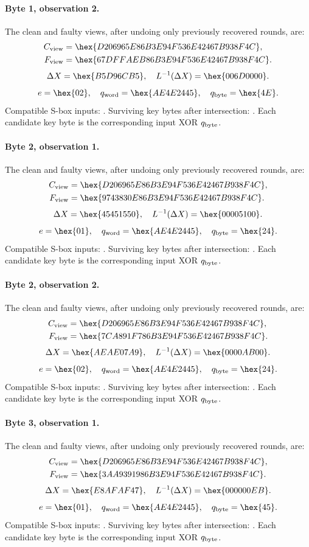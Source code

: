\paragraph{Byte 1, observation 2.}
The clean and faulty views, after undoing only previously recovered rounds, are:
\[\begin{aligned}C_{\rm view}&=\hex{D206965E86B3E94F536E42467B938F4C},\\F_{\rm view}&=\hex{67DFFAEB86B3E94F536E42467B938F4C}.\end{aligned}\]
\[\Delta X=\hex{B5D96CB5},\quad L^{-1}(\Delta X)=\hex{006D0000}.\]
\[e=\hex{02},\quad q_{\rm word}=\hex{AE4E2445},\quad q_{\rm byte}=\hex{4E}.\]
Compatible S-box inputs: . Surviving key bytes after intersection: . Each candidate key byte is the corresponding input XOR $q_{\rm byte}$.
\paragraph{Byte 2, observation 1.}
The clean and faulty views, after undoing only previously recovered rounds, are:
\[\begin{aligned}C_{\rm view}&=\hex{D206965E86B3E94F536E42467B938F4C},\\F_{\rm view}&=\hex{9743830E86B3E94F536E42467B938F4C}.\end{aligned}\]
\[\Delta X=\hex{45451550},\quad L^{-1}(\Delta X)=\hex{00005100}.\]
\[e=\hex{01},\quad q_{\rm word}=\hex{AE4E2445},\quad q_{\rm byte}=\hex{24}.\]
Compatible S-box inputs: . Surviving key bytes after intersection: . Each candidate key byte is the corresponding input XOR $q_{\rm byte}$.
\paragraph{Byte 2, observation 2.}
The clean and faulty views, after undoing only previously recovered rounds, are:
\[\begin{aligned}C_{\rm view}&=\hex{D206965E86B3E94F536E42467B938F4C},\\F_{\rm view}&=\hex{7CA891F786B3E94F536E42467B938F4C}.\end{aligned}\]
\[\Delta X=\hex{AEAE07A9},\quad L^{-1}(\Delta X)=\hex{0000AB00}.\]
\[e=\hex{02},\quad q_{\rm word}=\hex{AE4E2445},\quad q_{\rm byte}=\hex{24}.\]
Compatible S-box inputs: . Surviving key bytes after intersection: . Each candidate key byte is the corresponding input XOR $q_{\rm byte}$.
\paragraph{Byte 3, observation 1.}
The clean and faulty views, after undoing only previously recovered rounds, are:
\[\begin{aligned}C_{\rm view}&=\hex{D206965E86B3E94F536E42467B938F4C},\\F_{\rm view}&=\hex{3AA9391986B3E94F536E42467B938F4C}.\end{aligned}\]
\[\Delta X=\hex{E8AFAF47},\quad L^{-1}(\Delta X)=\hex{000000EB}.\]
\[e=\hex{01},\quad q_{\rm word}=\hex{AE4E2445},\quad q_{\rm byte}=\hex{45}.\]
Compatible S-box inputs: . Surviving key bytes after intersection: . Each candidate key byte is the corresponding input XOR $q_{\rm byte}$.
